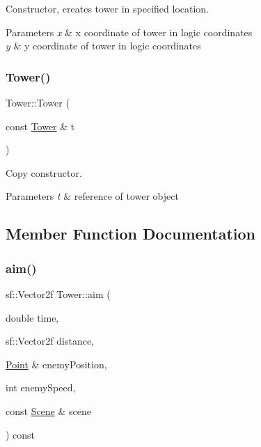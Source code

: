 Constructor, creates tower in specified location. 


\begin{DoxyParams}{Parameters}
{\em x} & x coordinate of tower in logic coordinates \\
\hline
{\em y} & y coordinate of tower in logic coordinates \\
\hline
\end{DoxyParams}
\mbox{\label{class_tower_a36ad07a9298039e649fcc4eb01dce120}} 
\subsubsection{\texorpdfstring{Tower()}{Tower()}\hspace{0.1cm}{\footnotesize\ttfamily [2/2]}}
{\footnotesize\ttfamily Tower\+::\+Tower (\begin{DoxyParamCaption}\item[{const \mbox{\hyperlink{class_tower}{Tower}} \&}]{t }\end{DoxyParamCaption})}



Copy constructor. 


\begin{DoxyParams}{Parameters}
{\em t} & reference of tower object \\
\hline
\end{DoxyParams}


\subsection{Member Function Documentation}
\mbox{\label{class_tower_a1184d64afe39819372e94f8d0e678c7f}} 
\subsubsection{\texorpdfstring{aim()}{aim()}}
{\footnotesize\ttfamily sf\+::\+Vector2f Tower\+::aim (\begin{DoxyParamCaption}\item[{double}]{time,  }\item[{sf\+::\+Vector2f}]{distance,  }\item[{\mbox{\hyperlink{class_point}{Point}} \&}]{enemy\+Position,  }\item[{int}]{enemy\+Speed,  }\item[{const \mbox{\hyperlink{class_scene}{Scene}} \&}]{scene }\end{DoxyParamCaption}) const\hspace{0.3cm}{\ttfamily [protected]}}



